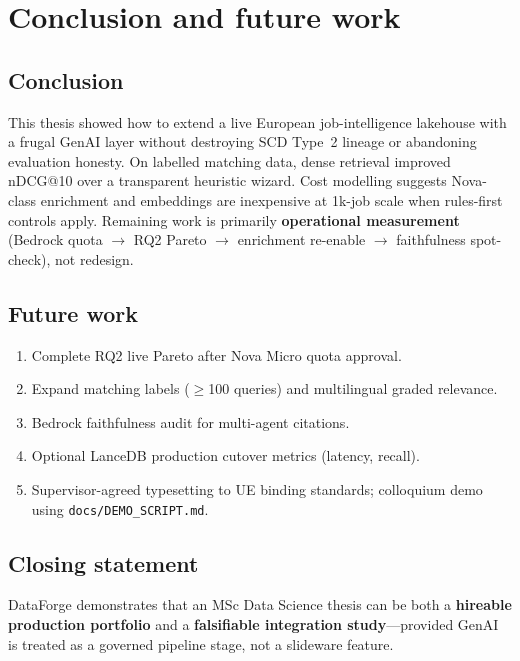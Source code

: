 \chapter{Conclusion and future work}
\label{ch:conclusion}

\section{Conclusion}

This thesis showed how to extend a live European job-intelligence lakehouse with a frugal GenAI layer without destroying SCD Type~2 lineage or abandoning evaluation honesty. On labelled matching data, dense retrieval improved nDCG@10 over a transparent heuristic wizard. Cost modelling suggests Nova-class enrichment and embeddings are inexpensive at 1k-job scale when rules-first controls apply. Remaining work is primarily \textbf{operational measurement} (Bedrock quota $\rightarrow$ RQ2 Pareto $\rightarrow$ enrichment re-enable $\rightarrow$ faithfulness spot-check), not redesign.

\section{Future work}

\begin{enumerate}[leftmargin=*]
  \item Complete RQ2 live Pareto after Nova Micro quota approval.
  \item Expand matching labels ($\geq$100 queries) and multilingual graded relevance.
  \item Bedrock faithfulness audit for multi-agent citations.
  \item Optional LanceDB production cutover metrics (latency, recall).
  \item Supervisor-agreed typesetting to UE binding standards; colloquium demo using \texttt{docs/DEMO\_SCRIPT.md}.
\end{enumerate}

\section{Closing statement}

DataForge demonstrates that an MSc Data Science thesis can be both a \textbf{hireable production portfolio} and a \textbf{falsifiable integration study}---provided GenAI is treated as a governed pipeline stage, not a slideware feature.
